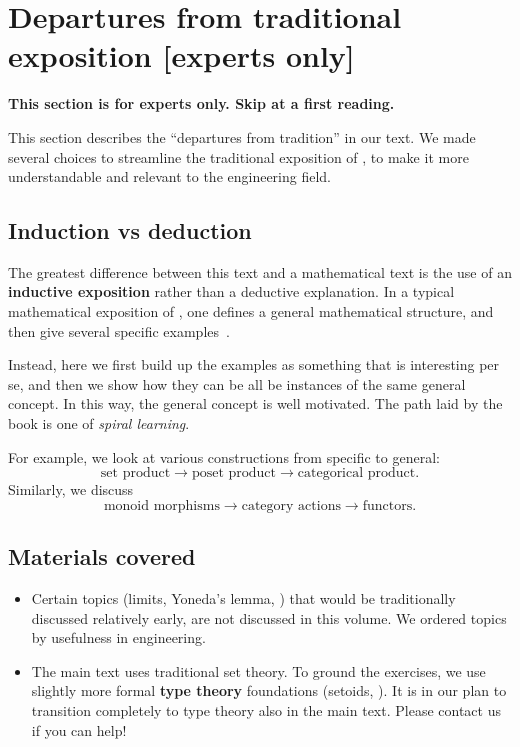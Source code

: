 
\section[Departures from tradition]{Departures from traditional exposition [experts only]}

\textbf{This section is for experts only.
    Skip at a first reading.
}

This section describes the ``departures from tradition'' in our text.
We made several choices to streamline the traditional exposition of , to make it more understandable and relevant to the engineering field.

\subsection{Induction vs deduction}

The greatest difference between this text and a mathematical text is the use of an \textbf{inductive exposition} rather than a deductive explanation.
In a typical mathematical exposition of , one defines a general mathematical structure, and then give several specific examples~\cite{riehl2017category}.

Instead, here we first build up the examples as something that is interesting per se, and then we show how they can be all be instances of the same general concept.
In this way, the general concept is well motivated.
The path laid by the book is one of \emph{spiral learning}.

For example, we look at various constructions from specific to general:
%
\begin{equation}
    \text{set product}  \rightarrow \text{poset product} \rightarrow \text{categorical product}.
\end{equation}
%
Similarly, we discuss
%
\begin{equation}
    \text{monoid morphisms}  \rightarrow \text{category actions} \rightarrow \text{functors}.
\end{equation}

\subsection{Materials covered}
\begin{itemize}
    \item Certain topics (limits, Yoneda's lemma, \etc) that would be traditionally discussed relatively early, are not discussed in this volume.
          We ordered topics by usefulness in engineering.

    \item The main text uses traditional set theory.
          To ground the exercises, we use slightly more formal \textbf{type theory} foundations (setoids, \etc).
          It is in our plan to transition completely to type theory also in the main text.
          Please contact us if you can help!

\end{itemize}

